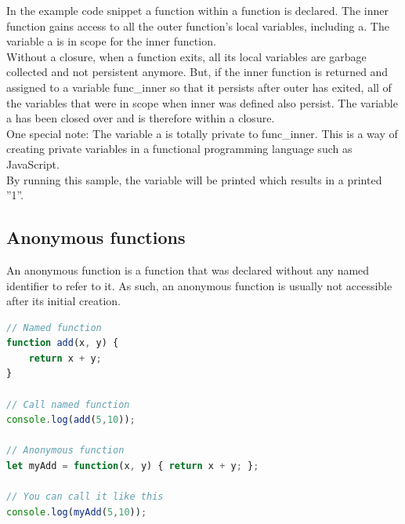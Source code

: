 \documentclass[12pt]{article}
\begin{document}
In the example code snippet a function within a function is declared. The inner function gains access to all the outer function's local variables, including a. The variable a is in scope for the inner function.\\
Without a closure, when a function exits, all its local variables are garbage collected and not persistent anymore. But, if the inner function is returned and assigned to a variable func\_inner so that it persists after outer has exited, all of the variables that were in scope when inner was defined also persist. The variable a has been closed over and is therefore within a closure.\\
One special note: The variable a is totally private to func\_inner. This is a way of creating private variables in a functional programming language such as JavaScript.\\
By running this sample, the variable will be printed which results in a printed ''1''.

\subsection{Anonymous functions}

An anonymous function is a function that was declared without any named identifier to refer to it. As such, an anonymous function is usually not accessible after its initial creation.
 
\begin{lstlisting}[language=javascript]
// Named function
function add(x, y) {
    return x + y;
}

// Call named function
console.log(add(5,10));

// Anonymous function
let myAdd = function(x, y) { return x + y; };

// You can call it like this
console.log(myAdd(5,10));
\end{lstlisting}

 
\end{document}
